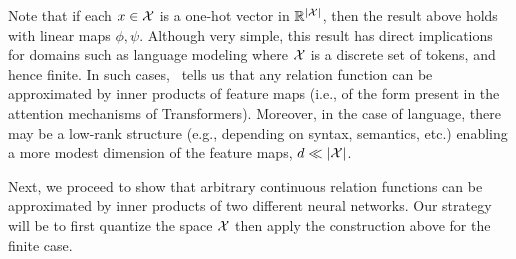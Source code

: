 Note that if each $x \in {\mathcal{X}}$ is a one-hot vector in $\mathbb{R}^{\left\lvert{\mathcal{X}}\right\rvert}$, then the result above holds with linear maps $\phi, \psi$. Although very simple, this result has direct implications for domains such as language modeling where ${\mathcal{X}}$ is a discrete set of tokens, and hence finite. In such cases,~ tells us that any relation function can be approximated by inner products of feature maps (i.e., of the form present in the attention mechanisms of Transformers). Moreover, in the case of language, there may be a low-rank structure (e.g., depending on syntax, semantics, etc.) enabling a more modest dimension of the feature maps, $d \ll \left\lvert{\mathcal{X}}\right\rvert$.

Next, we proceed to show that arbitrary continuous relation functions can be approximated by inner products of two different neural networks. Our strategy will be to first quantize the space ${\mathcal{X}}$ then apply the construction above for the finite case.

